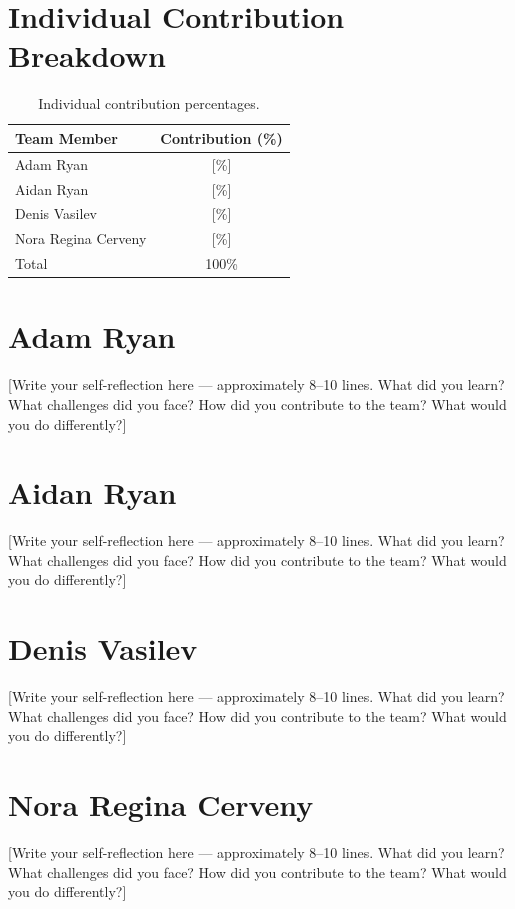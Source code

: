 \documentclass{imc-inf}
\begin{document}
\section*{Individual Contribution Breakdown}

\begin{table}[htbp]
\centering
\caption{Individual contribution percentages.}
\label{tab:contributions}
\large
\begin{tabular}{@{}lc@{}}
\toprule
\textbf{Team Member} & \textbf{Contribution (\%)} \\
\midrule
Adam Ryan   & [\%] \\
Aidan Ryan  & [\%] \\
Denis Vasilev & [\%] \\
Nora Regina Cerveny & [\%] \\
\midrule
Total & 100\% \\
\bottomrule
\end{tabular}
\end{table}

\newpage
\section*{Adam Ryan}
[Write your self-reflection here --- approximately 8--10 lines. What did you learn?
What challenges did you face? How did you contribute to the team? What would you
do differently?]

\section*{Aidan Ryan}
[Write your self-reflection here --- approximately 8--10 lines. What did you learn?
What challenges did you face? How did you contribute to the team? What would you
do differently?]

\section*{Denis Vasilev}
[Write your self-reflection here --- approximately 8--10 lines. What did you learn?
What challenges did you face? How did you contribute to the team? What would you
do differently?]

\section*{Nora Regina Cerveny}
[Write your self-reflection here --- approximately 8--10 lines. What did you learn?
What challenges did you face? How did you contribute to the team? What would you
do differently?]
\end{document}
